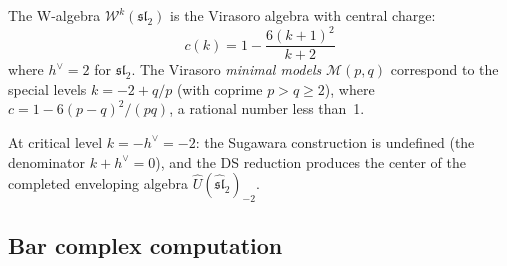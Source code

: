 \begin{proposition}
\label{prop:virasoro-from-sl2}
The W-algebra $\mathcal{W}^k(\mathfrak{sl}_2)$ is the Virasoro algebra with central charge:
\begin{equation}
c(k) = 1 - \frac{6(k+1)^2}{k+2}
\end{equation}
where $h^\vee = 2$ for $\mathfrak{sl}_2$. The Virasoro \emph{minimal models} $\mathcal{M}(p,q)$
correspond to the special levels $k = -2 + q/p$ (with coprime $p > q \geq 2$),
where $c = 1 - 6(p-q)^2/(pq)$, a rational number less than~1.

At critical level $k = -h^\vee = -2$: the Sugawara construction is undefined
(the denominator $k + h^\vee = 0$), and the DS reduction produces the center of
the completed enveloping algebra $\widehat{U}(\widehat{\mathfrak{sl}}_2)_{-2}$.
\end{proposition}

\subsection{Bar complex computation}

